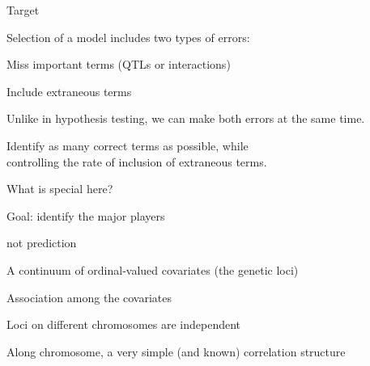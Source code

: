 \documentclass[aspectratio=169,12pt,t]{beamer}
\begin{document}
\begin{frame}{Target}


\bbi

\item Selection of a model includes two types of errors:
\bi
\item Miss important terms (QTLs or interactions)
\item Include extraneous terms
\ei

\item Unlike in hypothesis testing, we can make {\hilit both errors} at
the same time.

\item {\hilit Identify as many correct terms as possible, while \\
{\vhilit controlling the rate of inclusion of extraneous terms}.}
\ei

\end{frame}









\begin{frame}{What is special here?}


\bbi

\item Goal: identify the major players
  \bi
  \item {\vhilit not} prediction
  \ei

\item A continuum of ordinal-valued covariates (the genetic loci)

\item Association among the covariates

\bi
\item Loci on different chromosomes are independent
\item Along chromosome, a very simple (and known) correlation
  structure
\ei

\ei

\end{frame}
\end{document}
